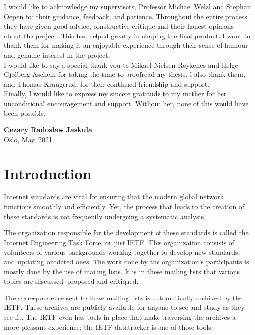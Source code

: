 \documentclass[a4paper,english]{report}
\begin{document}
I would like to acknowledge my supervisors, Professor Michael Welzl and Stephan Oepen for their guidance, feedback, and patience. Throughout the entire process they have given good advice, constructive critique and their honest opinions about the project. This has helped greatly in shaping the final product. I want to thank them for making it an enjoyable experience through their sense of humour and genuine interest in the project.\\

I would like to say a special thank you to Mikael Nielsen Røykenes and Helge Gjølberg Aschem for taking the time to proofread my thesis. I also thank them, and Thomas Kraugerud, for their continued friendship and support. \\

Finally, I would like to express my sincere gratitude to my mother for her unconditional encouragement and support. Without her, none of this would have been possible.


\begin{flushright}
\textbf{Cezary Radoslaw Jaskula}\\

Oslo, May, 2021
\end{flushright}




\tableofcontents



 \chapter{Introduction}


Internet standards are vital for ensuring that the modern global network functions smoothly and efficiently. Yet, the process that leads to the creation of these standards is not frequently undergoing a systematic analysis. 

The organization responsible for the development of these standards is called the Internet Engineering Task Force, or just IETF. This organization consists of volunteers of various backgrounds working together to develop new standards, and updating outdated ones. The work done by the organization's participants is mostly done by the use of mailing lists. It is in these mailing lists that various topics are discussed, proposed and critiqued.

The correspondence sent to these mailing lists is automatically archived by the IETF. These archives are publicly available for anyone to see and study as they see fit. 
The IETF even has tools in place that make traversing the archives a more pleasant experience; the IETF datatracker is one of those tools.
\end{document}
